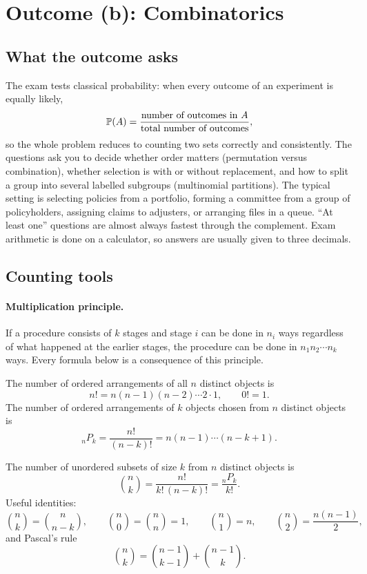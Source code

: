 \section{Outcome (b): Combinatorics}

\subsection{What the outcome asks}

The exam tests classical probability: when every outcome of an experiment is equally likely,
\[
\mathbb{P}(A) = \frac{\text{number of outcomes in } A}{\text{total number of outcomes}},
\]
so the whole problem reduces to counting two sets correctly and consistently. The questions
ask you to decide whether order matters (permutation versus combination), whether selection is
with or without replacement, and how to split a group into several labelled subgroups
(multinomial partitions). The typical setting is selecting policies from a portfolio, forming
a committee from a group of policyholders, assigning claims to adjusters, or arranging files
in a queue. ``At least one'' questions are almost always fastest through the complement.
Exam arithmetic is done on a calculator, so answers are usually given to three decimals.

\subsection{Counting tools}

\paragraph{Multiplication principle.}
If a procedure consists of $k$ stages and stage $i$ can be done in $n_i$ ways regardless of
what happened at the earlier stages, the procedure can be done in $n_1 n_2 \cdots n_k$ ways.
Every formula below is a consequence of this principle.

\begin{keyfact}
The number of ordered arrangements of all $n$ distinct objects is
\[
n! = n(n-1)(n-2)\cdots 2 \cdot 1, \qquad 0! = 1 .
\]
The number of ordered arrangements of $k$ objects chosen from $n$ distinct objects is
\[
{}_nP_k = \frac{n!}{(n-k)!} = n(n-1)\cdots(n-k+1) .
\]
\end{keyfact}

\begin{keyfact}
The number of unordered subsets of size $k$ from $n$ distinct objects is
\[
\binom{n}{k} = \frac{n!}{k!\,(n-k)!} = \frac{{}_nP_k}{k!} .
\]
Useful identities:
\[
\binom{n}{k} = \binom{n}{n-k}, \qquad
\binom{n}{0} = \binom{n}{n} = 1, \qquad
\binom{n}{1} = n, \qquad
\binom{n}{2} = \frac{n(n-1)}{2},
\]
and Pascal's rule
\[
\binom{n}{k} = \binom{n-1}{k-1} + \binom{n-1}{k} .
\]
\end{keyfact}

